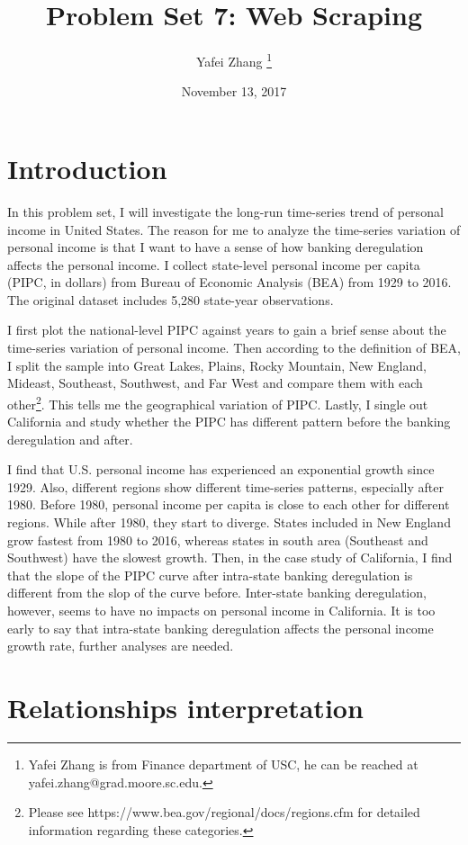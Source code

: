 \documentclass[letterpaper,12pt]{article}
\title{Problem Set 7: Web Scraping}
\author{Yafei Zhang \thanks{Yafei Zhang is from Finance department of USC, he can be reached at yafei.zhang@grad.moore.sc.edu.}}
\date{November 13, 2017}
\theoremstyle{definition}
\begin{document}
\maketitle

\vspace{5mm}

\section{Introduction}

In this problem set, I will investigate the long-run time-series trend of personal income in United States. The reason for me to analyze the time-series variation of personal income is that I want to have a sense of how banking deregulation affects the personal income. I collect state-level personal income per capita (PIPC, in dollars) from Bureau of Economic Analysis (BEA) from 1929 to 2016. The original dataset includes 5,280 state-year observations.

I first plot the national-level PIPC against years to gain a brief sense about the time-series variation of personal income. Then according to the definition of BEA, I split the sample into Great Lakes, Plains, Rocky Mountain, New England, Mideast, Southeast, Southwest, and Far West and compare them with each other\footnote{Please see https://www.bea.gov/regional/docs/regions.cfm for detailed information regarding these categories.}. This tells me the geographical variation of PIPC. Lastly, I single out California and study whether the PIPC has different pattern before the banking deregulation and after.

I find that U.S. personal income has experienced an exponential growth since 1929. Also, different regions show different time-series patterns, especially after 1980. Before 1980, personal income per capita is close to each other for different regions. While after 1980, they start to diverge. States included in New England grow fastest from 1980 to 2016, whereas states in south area (Southeast and Southwest) have the slowest growth. Then, in the case study of California, I find that the slope of the PIPC curve after intra-state banking deregulation is different from the slop of the curve before. Inter-state banking deregulation, however, seems to have no impacts on personal income in California. It is too early to say that intra-state banking deregulation affects the personal income growth rate, further analyses are needed.


\section{Relationships interpretation}
\end{document}
